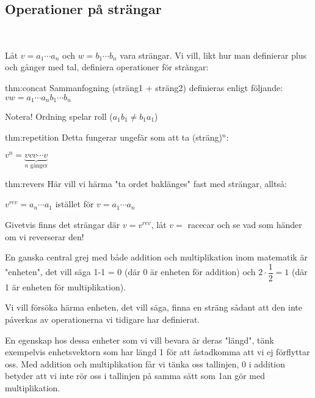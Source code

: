 \subsection{Operationer på strängar}\hfill\\
\par
\noindent Låt $v = a_1\cdots a_n$ och $w = b_1\cdots b_n$ vara strängar. Vi vill, likt hur man definierar plus och gånger med tal, definiera operationer för strängar:
\par\bigskip
\begin{theo}[Sammanfogning]{thm:concat}
  Sammanfogning (sträng1 + sträng2) definieras enligt följande: $vw = a_1\cdots a_nb_1\cdots b_n$\par
  \noindent Notera! Ordning spelar roll ($a_1b_1 \neq b_1a_1$)
\end{theo}
\par\bigskip
\begin{theo}{thm:repetition}
  Detta fungerar ungefär som att ta (sträng)$^n$:\par
  \noindent $v^n = \underbrace{vvv\cdots v}_{\text{$n$ gånger}}$
\end{theo}
\par\bigskip
\begin{theo}[Reversering]{thm:revers}
  Här vill vi härma "ta ordet baklänges" fast med strängar, alltså:\par
  \noindent $v^{rev} = a_n\cdots a_1$ istället för $v = a_1\cdots a_n$
  \par\bigskip
  \noindent Givetvis finns det strängar där $v=v^{rev}$, låt $v= $ racecar och se vad som händer om vi reverserar den!
\end{theo}
\par\bigskip
\noindent En ganska central grej med både addition och multiplikation inom matematik är "enheten", det vill säga 1-1 = 0 (där 0 är enheten för addition) och $2\cdot\dfrac{1}{2}=1$ (där 1 är enheten för multiplikation).\par
\noindent Vi vill försöka härma enheten, det vill säga, finna en sträng sådant att den inte påverkas av operationerna vi tidigare har definierat.\par
\noindent En egenskap hos dessa enheter som vi vill bevara är deras "längd", tänk exempelvis enhetsvektorn som har längd 1 för att åstadkomma att vi ej förflyttar oss. Med addition och multiplikation får vi tänka oss tallinjen, 0 i addition betyder att vi inte rör oss i tallinjen på samma sätt som 1an gör med multiplikation.
\par\bigskip
